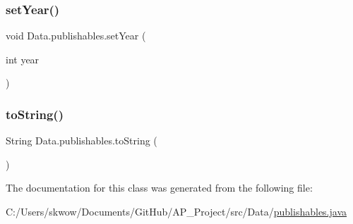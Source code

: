 \subsubsection{\texorpdfstring{set\+Year()}{setYear()}}
{\footnotesize\ttfamily void Data.\+publishables.\+set\+Year (\begin{DoxyParamCaption}\item[{int}]{year }\end{DoxyParamCaption})}

\hypertarget{class_data_1_1publishables_a61c53fb0b33bffd164b4cbba2b5add43}{}\label{class_data_1_1publishables_a61c53fb0b33bffd164b4cbba2b5add43} 
\subsubsection{\texorpdfstring{to\+String()}{toString()}}
{\footnotesize\ttfamily String Data.\+publishables.\+to\+String (\begin{DoxyParamCaption}{ }\end{DoxyParamCaption})}



The documentation for this class was generated from the following file\+:\begin{DoxyCompactItemize}
\item 
C\+:/\+Users/skwow/\+Documents/\+Git\+Hub/\+A\+P\+\_\+\+Project/src/\+Data/\hyperlink{publishables_8java}{publishables.\+java}\end{DoxyCompactItemize}
